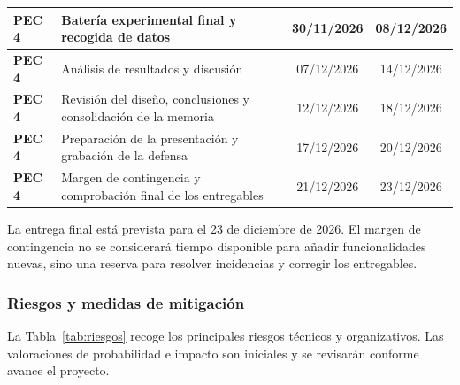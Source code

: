 \begin{table}[htbp]
\begin{tabularx}{\textwidth}{|>{\bfseries}l|X|c|c|}
    PEC 4 & Batería experimental final y recogida de datos & 30/11/2026 & 08/12/2026 \\ \hline
    PEC 4 & Análisis de resultados y discusión & 07/12/2026 & 14/12/2026 \\ \hline
    PEC 4 & Revisión del diseño, conclusiones y consolidación de la memoria & 12/12/2026 & 18/12/2026 \\ \hline
    PEC 4 & Preparación de la presentación y grabación de la defensa & 17/12/2026 & 20/12/2026 \\ \hline
    PEC 4 & Margen de contingencia y comprobación final de los entregables & 21/12/2026 & 23/12/2026 \\ \hline
  \end{tabularx}
\end{table}

La entrega final está prevista para el 23 de diciembre de 2026. El margen de contingencia no se considerará tiempo disponible para añadir funcionalidades nuevas, sino una reserva para resolver incidencias y corregir los entregables.

\subsubsection{Riesgos y medidas de mitigación}

La Tabla~\ref{tab:riesgos} recoge los principales riesgos técnicos y organizativos. Las valoraciones de probabilidad e impacto son iniciales y se revisarán conforme avance el proyecto.

